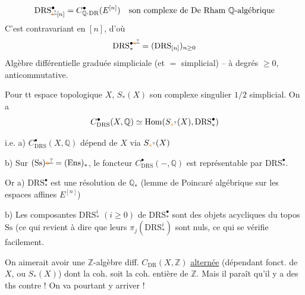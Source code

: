 \[
\mathrm{DRS}^{\bullet}_{\deleted{\unsure{i}}[n]}=C^\bullet_{\mathbb Q\text{-}\mathrm{DR}}(E^{[n]})\quad\text{son complexe de De Rham $\mathbb Q$-algébrique}
\]
C'est contravariant en $[n]$, d'où
\[
\mathrm{DRS}^{\bullet\deleted{\unsure{\ast}}}_{\ast}=(\mathrm{DRS}_{[n]})_{n\geq 0}
\]
Algèbre différentielle graduée simpliciale (et $=$ simplicial) -- à degrés $\geq 0$, anticommutative.

Pour tt espace topologique $X$, $S_{\ast}(X)$ son complexe singulier $1/2$ simplicial. On a
\[
C^\bullet_{\mathrm{DRS}}(X,\mathbb Q)\simeq\mathrm{Hom}(S_{\unsure{\ast}}(X),\mathrm{DRS}^{\bullet}_{\ast})
\]

i.e. \quad a) $C^\bullet_{\mathrm{DRS}}(X,\mathbb Q)$ dépend de $X$ via $S_{\unsure{\ast}}(X)$

b) Sur $(\mathrm{Ss})\deleted{\unsure{\ast}}=(\mathrm{Ens})_{\ast}$, le foncteur $C^\bullet_{\mathrm{DRS}}(-,\mathbb Q)$ est représentable par $\mathrm{DRS}^{\bullet}_{\ast}$.

Or \quad a) $\mathrm{DRS}^{\bullet}_{\ast}$ est une résolution de $\mathbb Q_{\ast}$  (lemme de Poincaré algébrique sur les espaces affines $E^{[n]}$)

b) Les composantes $\mathrm{DRS}^{i}_{\ast}$ $(i\geq 0)$ de $\mathrm{DRS}^{\bullet}_{\ast}$ sont des objets  acycliques du topos $\mathrm{Ss}$ (ce qui revient à dire que leurs $\pi_j(\mathrm{DRS}^{i}_{\ast})$ sont nuls, ce qui se vérifie facilement. 

 On aimerait avoir une $\mathbb Z$-algèbre diff. $C_{\mathrm{DR}}(X,\mathbb Z)$ \uline{alternée} (dépendant fonct. de $X$, ou $S_{\ast}(X)$) dont la coh. soit la coh. entière de $\mathbb Z$. Mais il paraît qu'il y a des ths contre ! On va pourtant y arriver  !

